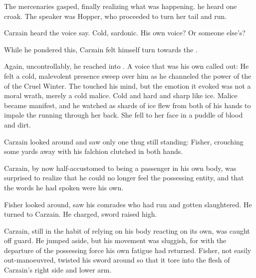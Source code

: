 The mercenaries gasped, finally realizing what was happening. 
 he heard one croak. 
The speaker was Hopper, who proceeded to turn her tail and run.  

 Carzain heard the voice say. 
Cold, sardonic. 
His own voice? 
Or someone else's? 

While he pondered this, Carzain felt himself turn towards the \meccaran.

Again, uncontrollably, he reached into \Itzach. 
A voice that was his own called out: 
He felt a cold, malevolent presence sweep over him as he channeled the power of the \Kliffah{} of the Cruel Winter. 
The \Kliffah{} touched his mind, but the emotion it evoked was not a moral wrath, merely a cold malice. 
Cold and hard and sharp like ice. 
Malice became manifest, and he watched as shards of ice flew from both of his hands to impale the running \meccaran{} through her back. She fell to her face in a puddle of blood and dirt. 


\begin{comment}
\subsubsection{Showdown with Fisher}
\end{comment}
Carzain looked around and saw only one thug still standing: 
Fisher, crouching some yards away with his falchion clutched in both hands. 


Carzain, by now half-accustomed to being a passenger in his own body, was surprised to realize that he could no longer feel the possessing entity, and that the words he had spoken were his own. 


Fisher looked around, saw his comrades who had run and gotten slaughtered. 
He turned to Carzain. 
He charged, sword raised high. 

Carzain, still in the habit of relying on his body reacting on its own, was caught off guard. 
He jumped aside, but his movement was sluggish, for with the departure of the possessing force his own fatigue had returned. 
Fisher, not easily out-manoeuvred, twisted his sword around so that it tore into the flesh of Carzain's right side and lower arm. 


